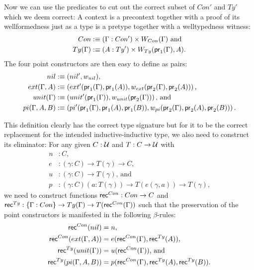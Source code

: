 Now we can use the predicates to cut out the correct subset of $Con'$ and
$Ty'$ which we deem correct:
A context is a precontext together with a proof of its wellformedness just
as a type is a pretype together with a welltypedness witness:
\begin{align*}
Con &:\equiv (\Gamma : Con') \times W_{Con}(\Gamma) \text{ and}\\
Ty(\Gamma) &:\equiv (A : Ty') \times W_{Ty}(\mathsf{pr}_1(\Gamma), A) \text{.}
\end{align*}
The four point constructors are then easy to define as pairs:
\begin{align*}
nil &:\equiv (nil', w_{nil}) \text{,}\\
ext(\Gamma, A) &:\equiv \left(ext'(\mathsf{pr}_1(\Gamma),
    \mathsf{pr}_1(A)), w_{ext}(\mathsf{pr}_2(\Gamma), \mathsf{pr}_2(A)) \right) \text{,}\\
unit(\Gamma) &:\equiv \left(unit'(\mathsf{pr}_1(\Gamma)),
    w_{unit}(\mathsf{pr}_2(\Gamma)) \right) \text{, and}\\
pi(\Gamma, A, B) &:\equiv \left(pi'(\mathsf{pr}_1(\Gamma), \mathsf{pr}_1(A), \mathsf{pr}_1(B)),
   w_{pi}(\mathsf{pr}_2(\Gamma), \mathsf{pr}_2(A), \mathsf{pr}_2(B)) \right) \text{.}
\end{align*}

This definition clearly has the correct type signature but for it to be the correct
replacement for the intended inductive-inductive type,
we also need to construct its eliminator:
For any given $C : \mathcal{U}$ and $T : C \to \mathcal{U}$ with
\begin{align*}
n &: C \text{,} \\
e &: (\gamma : C) \to T(\gamma) \to C \text{,} \\
u &: (\gamma : C) \to T(\gamma) \text{, and} \\
p &: (\gamma : C) (a : T(\gamma)) \to T(e(\gamma, a)) \to T(\gamma) \text{,}
\end{align*}
we need to construct functions $\mathsf{rec}^{Con} : Con \to C$ and 
$\mathsf{rec}^{Ty} : \{\Gamma : Con\} \to Ty(\Gamma) \to T(\mathsf{rec}^{Con}(\Gamma))$ such
that the preservation of the point constructors is manifested in the
following $\beta$-rules:
\begin{align*}
\mathsf{rec}^{Con}(nil)
  &= n \text{,} \\
\mathsf{rec}^{Con}(ext(\Gamma, A))
  &= e(\mathsf{rec}^{Con}(\Gamma), \mathsf{rec}^{Ty}(A)) \text{,} \\
\mathsf{rec}^{Ty}(unit(\Gamma))
  &= u(\mathsf{rec}^{Con}(\Gamma)) \text{, and} \\
\mathsf{rec}^{Ty}(pi(\Gamma, A, B))
  &= p(\mathsf{rec}^{Con}(\Gamma), \mathsf{rec}^{Ty}(A), \mathsf{rec}^{Ty}(B)) \text{.}
\end{align*}

